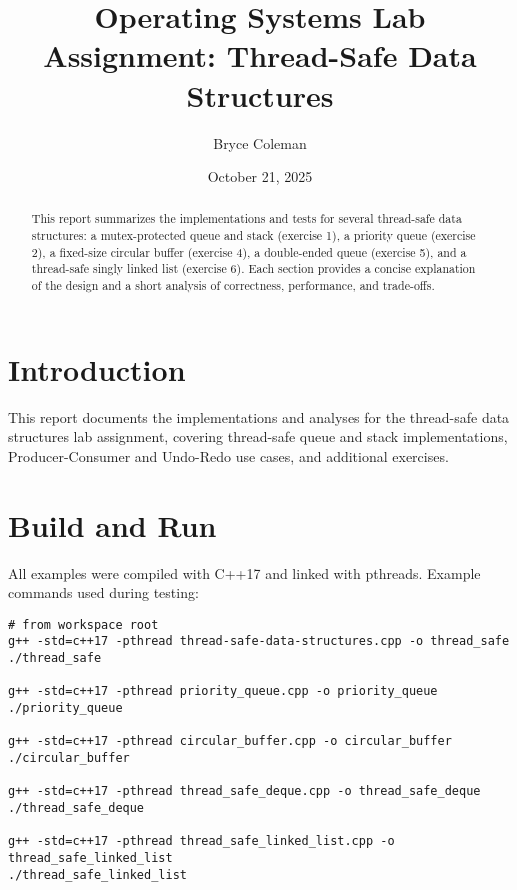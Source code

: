 \usepackage{geometry}
\geometry{a4paper, margin=1in}
\usepackage{graphicx}
\usepackage{listings}
\usepackage{xcolor}
\usepackage[utf8]{inputenc}




\title{Operating Systems Lab Assignment: Thread-Safe Data Structures}
\author{Bryce Coleman}
\date{October 21, 2025}
\maketitle

\section{Introduction}
This report documents the implementations and analyses for the thread-safe data structures lab assignment, covering thread-safe queue and stack implementations, Producer-Consumer and Undo-Redo use cases, and additional exercises.


\maketitle

\begin{abstract}
This report summarizes the implementations and tests for several thread-safe data structures: a mutex-protected queue and stack (exercise 1), a priority queue (exercise 2), a fixed-size circular buffer (exercise 4), a double-ended queue (exercise 5), and a thread-safe singly linked list (exercise 6). Each section provides a concise explanation of the design and a short analysis of correctness, performance, and trade-offs.
\end{abstract}

\section{Build and Run}
All examples were compiled with C++17 and linked with pthreads. Example commands used during testing:

\begin{lstlisting}[basicstyle=\ttfamily,breaklines=true]
# from workspace root
g++ -std=c++17 -pthread thread-safe-data-structures.cpp -o thread_safe
./thread_safe

g++ -std=c++17 -pthread priority_queue.cpp -o priority_queue
./priority_queue

g++ -std=c++17 -pthread circular_buffer.cpp -o circular_buffer
./circular_buffer

g++ -std=c++17 -pthread thread_safe_deque.cpp -o thread_safe_deque
./thread_safe_deque

g++ -std=c++17 -pthread thread_safe_linked_list.cpp -o thread_safe_linked_list
./thread_safe_linked_list
\end{lstlisting}

